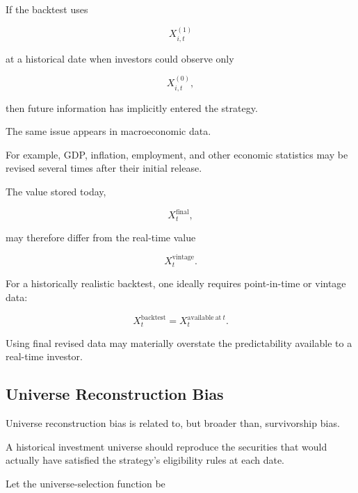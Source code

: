 \documentclass[11pt,a4paper]{article}
\begin{document}
If the backtest uses

\begin{equation}
X_{i,t}^{(1)}
\end{equation}

at a historical date when investors could observe only

\begin{equation}
X_{i,t}^{(0)},
\end{equation}

then future information has implicitly entered the strategy.

The same issue appears in macroeconomic data.

For example, GDP, inflation, employment, and other economic statistics may be
revised several times after their initial release.

The value stored today,

\begin{equation}
X_t^{\mathrm{final}},
\end{equation}

may therefore differ from the real-time value

\begin{equation}
X_t^{\mathrm{vintage}}.
\end{equation}

For a historically realistic backtest, one ideally requires point-in-time or
vintage data:

\begin{equation}
\boxed{
X_t^{\mathrm{backtest}}
=
X_t^{\mathrm{available\ at\ }t}.
}
\end{equation}

Using final revised data may materially overstate the predictability available
to a real-time investor.


\subsection{Universe Reconstruction Bias}
\label{subsec:universe_reconstruction_bias}

Universe reconstruction bias is related to, but broader than, survivorship
bias.

A historical investment universe should reproduce the securities that would
actually have satisfied the strategy's eligibility rules at each date.

Let the universe-selection function be
\end{document}
